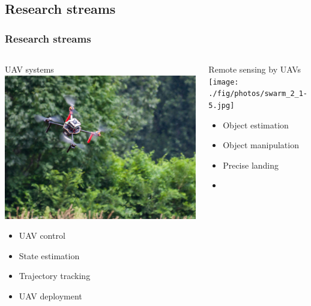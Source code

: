 \documentclass[aspectratio=169]{beamer}
\begin{document}
\subsection{Research streams}


\begin{frame}
\frametitle{Research streams}

\begin{columns}[c]


\begin{block}{UAV systems}
  \includegraphics[width=1.0\textwidth]{./fig/drona.jpg}
  \begin{itemize}
    \item UAV control
    \item State estimation
    \item Trajectory tracking
    \item UAV deployment
  \end{itemize}
\end{block}


\begin{block}{Remote sensing by UAVs}
  \texttt{[image: ./fig/photos/swarm\_2\_1-5.jpg]}
  \begin{itemize}
    \item Object estimation
    \item Object manipulation
    \item Precise landing
    \item 
  \end{itemize}
\end{block}


\end{columns}
\end{frame}
\end{document}
